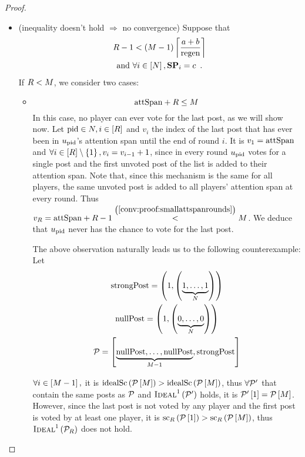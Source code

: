 \begin{proof}
\begin{itemize}
    \item (inequality doesn't hold $\Rightarrow$ no convergence) Suppose that
    \begin{gather}
      \label{conv:proof:fewrounds}
      \rounds - 1 < \left(\postlen - 1\right)\ceil*{\frac{a+b}{\regen}} \\
      \text{and } \forall i \in \left[\playerlen\right], \stpowvec_i = c
      \enspace. \nonumber
    \end{gather}
    If $R < M$, we consider two cases:
    \begin{itemize}
      \item \begin{equation}
        \label{conv:proof:smallattspanrounds}
        \attspan + \rounds \leq \postlen
      \end{equation}
      In this case, no player can ever vote for the last post, as we will show
      now. Let $\mathrm{pid} \in N, i \in \left[R\right]$ and $v_i$ the
      index of the last post that has ever been in $u_{\mathrm{pid}}$'s attention
      span until the end of round $i$. It is $v_1 = \mathrm{attSpan}$ and $\forall
      i \in \left[R\right] \setminus \left\{1\right\}, v_i = v_{i - 1} +
      1$, since in every round $u_{\mathrm{pid}}$ votes for a single post and the
      first unvoted post of the list is added to their attention span. Note
      that, since this mechanism is the same for all players, the same unvoted
      post is added to all players' attention span at every round. Thus
      $v_R = \mathrm{attSpan} + R - 1
      \overset{\left(\ref{conv:proof:smallattspanrounds}\right)}{<} M$.
      We deduce that $u_{\mathrm{pid}}$ never has the chance to vote for the last
      post.

      The above observation naturally leads us to the following counterexample:
      Let
      \begin{gather*}
        \mathrm{strongPost} = \left(1, \left(\underbrace{1, \dots,
        1}_{N}\right)\right) \\
        \mathrm{nullPost} = \left(1, \left(\underbrace{0, \dots,
        0}_{N}\right)\right) \\
        \mathcal{P} = \left[\underbrace{\mathrm{nullPost}, \dots, \mathrm{nullPost}}_{M -
        1}, \mathrm{strongPost}\right]
      \end{gather*}

      $\forall i \in \left[M - 1\right],$ it is
      $\mathrm{idealSc}\left(\mathcal{P}\left[M\right]\right) >
      \mathrm{idealSc}\left(\mathcal{P}\left[M\right]\right)$, thus $\forall \mathcal{P}'$ that
      contain the same posts as $\mathcal{P}$ and
      $\textsc{Ideal}^1\left(\mathcal{P}'\right)$ holds, it is
      $\mathcal{P}'\left[1\right] = \mathcal{P}\left[M\right]$. However,
      since the last post is not voted by any player and the first post is voted
      by at least one player, it is
      $\mathrm{sc}_R\left(\mathcal{P}\left[1\right]\right) >
      \mathrm{sc}_R\left(\mathcal{P}\left[M\right]\right)$, thus
      $\textsc{Ideal}^1\left(\mathcal{P}_R\right)$ does not hold.
    \end{itemize}


\end{itemize}
\end{proof}
